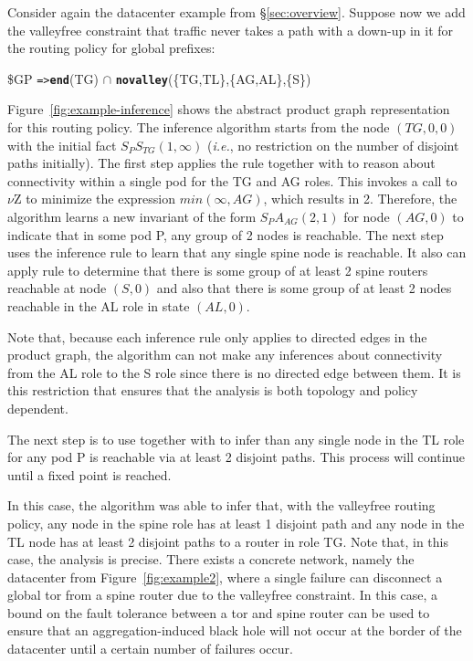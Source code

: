 \documentclass[numbers, 10pt, preprint]{sigplanconf}
\newcommand{\IE}{\emph{i.e.}}
\newcommand{\KW}[1]{\texttt{\small\bfseries{#1}}}
\newcommand{\Path}{\texttt{=>}}
\newcommand{\End}{\KW{end}}
\newcommand{\Novalley}{\KW{novalley}}
\begin{document}
Consider again the datacenter example from \S\ref{sec:overview}. Suppose now we add the valleyfree constraint that traffic never takes a path with a down-up in it for the routing policy for global prefixes:
%
\begin{code}
\$GP  \Path \End(TG) \ensuremath{\cap} \Novalley(\{TG,TL\},\{AG,AL\},\{S\})
\end{code}
\noindent
%
Figure~\ref{fig:example-inference} shows the abstract product graph representation for this routing policy. The inference algorithm starts from the node $(TG,0,0)$ with the initial fact $S_P S_{TG}(1,\infty)$ (\IE, no restriction on the number of disjoint paths initially).
%
The first step applies the rule  together with  to reason about connectivity within a single pod for the TG and AG roles. This invokes a call to $\nu$Z to minimize the expression $min(\infty, AG)$, which results in 2. Therefore, the algorithm learns a new invariant of the form $S_P A_{AG} (2,1)$ for node $(AG, 0)$ to indicate that in some pod P, any group of 2 nodes is reachable.
%
The next step uses the inference rule  to learn that any single spine node is reachable. It also can apply rule  to determine that there is some group of at least 2 spine routers reachable at node $(S,0)$ and also that there is some group of at least 2 nodes reachable in the AL role in state $(AL,0)$.

Note that, because each inference rule only applies to directed edges in the product graph, the algorithm can not make any inferences about connectivity from the AL role to the S role since there is no directed edge between them. It is this restriction that ensures that the analysis is both topology and policy dependent.

The next step is to use  together with  to infer than any single node in the TL role for any pod P is reachable via at least 2 disjoint paths. This process will continue until a fixed point is reached.

In this case, the algorithm was able to infer that, with the valleyfree routing policy, any node in the spine role has at least 1 disjoint path and any node in the TL node has at least 2 disjoint paths to a router in role TG. Note that, in this case, the analysis is precise. There exists a concrete network, namely the datacenter from Figure~\ref{fig:example2}, where a single failure can disconnect a global tor from a spine router due to the valleyfree constraint. In this case, a bound on the fault tolerance between a tor and spine router can be used to ensure that an aggregation-induced black hole will not occur at the border of the datacenter until a certain number of failures occur.
\end{document}
